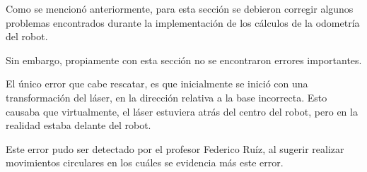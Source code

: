Como se mencionó anteriormente, para esta sección se debieron corregir algunos
problemas encontrados durante la implementación de los cálculos de la
odometría del robot.

Sin embargo, propiamente con esta sección no se encontraron errores importantes.

El único error que cabe rescatar, es que inicialmente se inició con una
transformación del láser, en la dirección relativa a la base incorrecta.
Esto causaba que virtualmente, el láser estuviera atrás del centro del robot,
pero en la realidad estaba delante del robot.

Este error pudo ser detectado por el profesor Federico Ruíz, al sugerir
realizar movimientos circulares en los cuáles se evidencia más este error.


